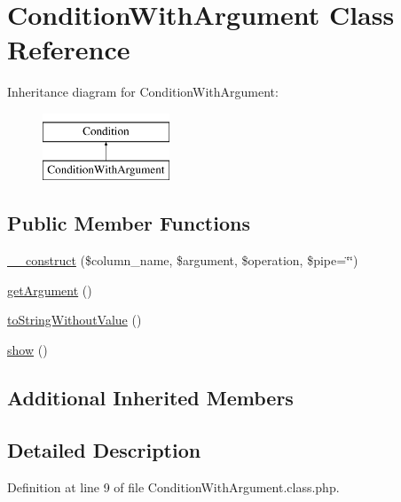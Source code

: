 \hypertarget{classConditionWithArgument}{\section{Condition\-With\-Argument Class Reference}
\label{classConditionWithArgument}
}
Inheritance diagram for Condition\-With\-Argument\-:\begin{figure}[H]
\begin{center}
\leavevmode
\includegraphics[height=2.000000cm]{classConditionWithArgument}
\end{center}
\end{figure}
\subsection*{Public Member Functions}
\begin{DoxyCompactItemize}
\item 
\hyperlink{classConditionWithArgument_af9fb0edb492fc6c8376f677c6ff76c6f}{\-\_\-\-\_\-construct} (\$column\-\_\-name, \$argument, \$operation, \$pipe=\char`\"{}\char`\"{})
\item 
\hyperlink{classConditionWithArgument_a58a782b4a1f7eb6fd802f8b49750aeb7}{get\-Argument} ()
\item 
\hyperlink{classConditionWithArgument_adf2841f219b6bf3b96414c2c6100ce6c}{to\-String\-Without\-Value} ()
\item 
\hyperlink{classConditionWithArgument_a1624017983d96c85a7fc0b2a986b6e25}{show} ()
\end{DoxyCompactItemize}
\subsection*{Additional Inherited Members}


\subsection{Detailed Description}


Definition at line 9 of file Condition\-With\-Argument.\-class.\-php.



